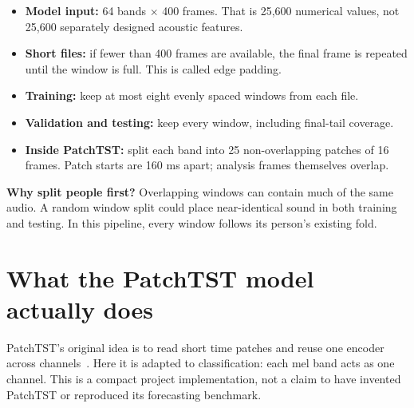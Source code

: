\documentclass[11pt,a4paper]{article}
\newcommand{\key}[1]{\textbf{#1}}
\begin{document}
\begin{itemize}
\item \key{Model input:} 64 bands $\times$ 400 frames. That is 25,600 numerical
values, not 25,600 separately designed acoustic features.
\item \key{Short files:} if fewer than 400 frames are available, the final frame
is repeated until the window is full. This is called edge padding.
\item \key{Training:} keep at most eight evenly spaced windows from each file.
\item \key{Validation and testing:} keep every window, including final-tail coverage.
\item \key{Inside PatchTST:} split each band into 25 non-overlapping patches of
16 frames. Patch starts are 160 ms apart; analysis frames themselves overlap.
\end{itemize}

\key{Why split people first?} Overlapping windows can contain much of the same
audio. A random window split could place near-identical sound in both training
and testing. In this pipeline, every window follows its person's existing fold.

\clearpage
\section{What the PatchTST model actually does}
PatchTST's original idea is to read short time patches and reuse one encoder
across channels~\cite{patchtst}. Here it is adapted to classification: each mel
band acts as one channel. This is a compact project implementation, not a claim
to have invented PatchTST or reproduced its forecasting benchmark.
\end{document}
